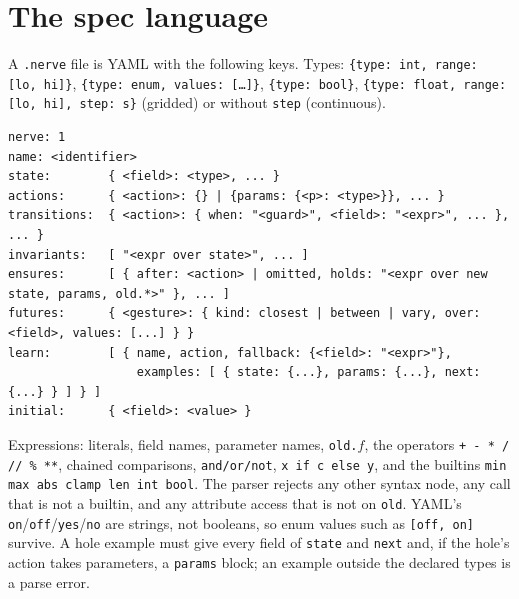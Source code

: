 \section{The spec language}
\label{app:grammar}

A \texttt{.nerve} file is YAML with the following keys. Types: \texttt{\{type: int, range: [lo, hi]\}}, \texttt{\{type: enum, values: [\dots]\}}, \texttt{\{type: bool\}}, \texttt{\{type: float, range: [lo, hi], step: s\}} (gridded) or without \texttt{step} (continuous).

\begin{lstlisting}
nerve: 1
name: <identifier>
state:        { <field>: <type>, ... }
actions:      { <action>: {} | {params: {<p>: <type>}}, ... }
transitions:  { <action>: { when: "<guard>", <field>: "<expr>", ... }, ... }
invariants:   [ "<expr over state>", ... ]
ensures:      [ { after: <action> | omitted, holds: "<expr over new state, params, old.*>" }, ... ]
futures:      { <gesture>: { kind: closest | between | vary, over: <field>, values: [...] } }
learn:        [ { name, action, fallback: {<field>: "<expr>"},
                  examples: [ { state: {...}, params: {...}, next: {...} } ] } ]
initial:      { <field>: <value> }
\end{lstlisting}

Expressions: literals, field names, parameter names, \texttt{old.}$f$, the operators \texttt{+ - * / // \% **}, chained comparisons, \texttt{and/or/not}, \texttt{x if c else y}, and the builtins \texttt{min max abs clamp len int bool}. The parser rejects any other syntax node, any call that is not a builtin, and any attribute access that is not on \texttt{old}. YAML's \texttt{on}/\texttt{off}/\texttt{yes}/\texttt{no} are strings, not booleans, so enum values such as \texttt{[off, on]} survive. A hole example must give every field of \texttt{state} and \texttt{next} and, if the hole's action takes parameters, a \texttt{params} block; an example outside the declared types is a parse error.

